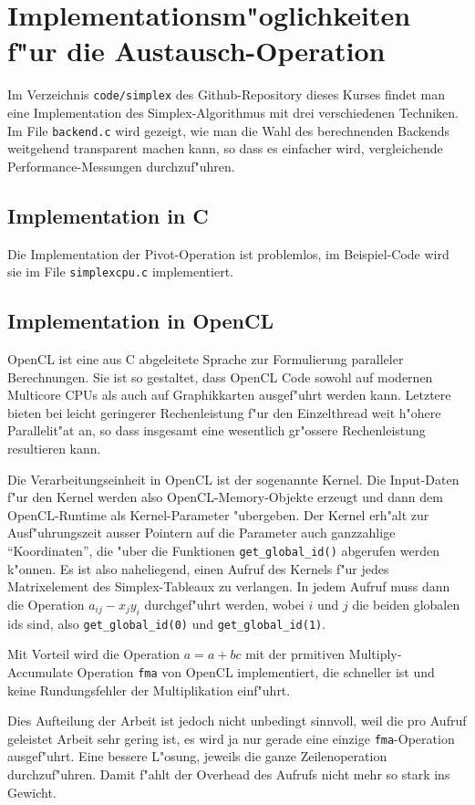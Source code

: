 \section{Implementationsm"oglichkeiten f"ur die Austausch-Operation}
Im Verzeichnis {\tt code/simplex} des Github-Repository
dieses Kurses findet man eine Implementation
des Simplex-Algorithmus mit drei verschiedenen Techniken.
Im File {\tt backend.c} wird gezeigt, wie man die Wahl des berechnenden
Backends weitgehend transparent machen kann, so dass es einfacher wird,
vergleichende Performance-Messungen durchzuf"uhren.

\subsection{Implementation in C}
Die Implementation der Pivot-Operation ist problemlos, im Beispiel-Code
wird sie im File {\tt simplexcpu.c} implementiert.

\subsection{Implementation in OpenCL}
OpenCL ist eine aus C abgeleitete Sprache zur Formulierung paralleler
Berechnungen. Sie ist so gestaltet, dass OpenCL Code sowohl auf 
modernen Multicore CPUs als auch auf Graphikkarten ausgef"uhrt
werden kann. Letztere bieten bei leicht geringerer
Rechenleistung f"ur den Einzelthread weit h"ohere Parallelit"at an,
so dass insgesamt eine wesentlich gr"ossere Rechenleistung resultieren kann.

Die Verarbeitungseinheit in OpenCL ist der sogenannte Kernel.
Die Input-Daten f"ur den Kernel werden also OpenCL-Memory-Objekte
erzeugt und dann dem OpenCL-Runtime als Kernel-Parameter "ubergeben.
Der Kernel erh"alt zur Ausf"uhrungszeit ausser Pointern auf die 
Parameter auch ganzzahlige ``Koordinaten'', die "uber die
Funktionen \verb+get_global_id()+ abgerufen werden k"onnen.
Es ist also naheliegend, einen Aufruf des Kernels f"ur jedes
Matrixelement des Simplex-Tableaux zu verlangen. In jedem
Aufruf muss dann die Operation $a_{ij}-x_jy_i$
durchgef"uhrt werden, wobei $i$ und $j$ die beiden
globalen ids sind, also
\verb+get_global_id(0)+ und
\verb+get_global_id(1)+.

Mit Vorteil wird die Operation $a=a+bc$ mit der prmitiven Multiply-Accu\-mulate
Operation {\tt fma} von OpenCL implementiert, die schneller ist und
keine Rundungsfehler der Multiplikation einf"uhrt.

Dies Aufteilung der Arbeit ist jedoch nicht unbedingt sinnvoll,
weil die pro Aufruf geleistet Arbeit sehr gering ist, es wird ja nur
gerade eine einzige {\tt fma}-Operation ausgef"uhrt.
Eine bessere L"osung, jeweils die ganze Zeilenoperation durchzuf"uhren.
Damit f"ahlt der Overhead des Aufrufs nicht mehr so stark ins Gewicht.

